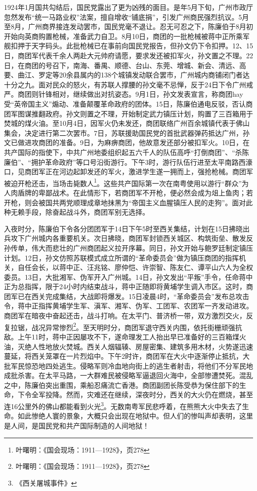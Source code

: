 1924年1月国共勾结后，国民党露出了更为凶残的面目。是年5月下旬，广州市政厅忽然发布“统一马路业权”法案，擅自增收“铺底捐”，引发广州商民强烈抗议。5月至8月，广州商界接连发动罢市，国民党毫不退让。忍无可忍之下，陈廉伯于8月初开始向英商购置枪械，准备武力自卫。8月10日，商团的一批枪械被蒋中正所乘军舰扣押于天字码头。此批枪械已在事前向国民党报告，但孙文仍下令扣押。12、15日，商团军代表千余人两赴大元帅府请愿，要求发还被扣军火，孙文置之不理。22日，在商团的号召下，南海、番禺、顺德、台山、东莞、增城、新会、清远、高要、曲江、罗定等20余县属内的138个城镇发动联合罢市，广州城内商铺闭门者达十分之九。面对民众的怒火，有苏联人撑腰的孙文毫不忌惮，反于24日下令广州戒严。商团则针锋相对，继续做出对抗姿态。9月1日，孙文发表宣言，称商团hay 受“英帝国主义”煽动、准备颠覆革命政府的团体。15日，陈廉伯通电反驳，否认商团军图谋推翻政府。孙文则置之不理，开始制定武力镇压计划，购置了三百箱用于焚城的煤火油。至10月4日，因军火仍未发还，商团联络广州百余城镇代表于佛山集会，决定进行第二次罢市。7日，苏联援助国民党的首批武器弹药抵达广州，孙文已做进攻商团的准备。9日，为麻痹商团，他故意发还部分被扣军火。10日，在共产国际的指使下，中共广州地委组织起五六千人的队伍高呼“打倒商团”、“杀陈廉伯”、“拥护革命政府”等口号沿街游行。下午3时，游行队伍行进至太平南路西濠口，见商团军正在河边起卸发还的军火，激进学生遂一拥而上，强抢枪械。商团军被迫开枪还击，当场击毙数人\footnote{叶曙明：《国会现场：1911—1928》，页278}。这些共产国际第一次在南粤使用以游行“群众”为人肉盾牌的卑鄙战术。在此情形下，若商团军不开枪，便必然会成为俎上鱼肉；若开枪，则会被国共两党顺理成章地抹黑为“帝国主义血腥镇压人民的走狗”。面对此种无赖手段，除奋起战斗外，商团军别无选择。

入夜时分，陈廉伯下令各分团团军于14日下午5时至西关集结，计划在15日拂晓出兵攻下广州城内各重要机关。次日拂晓，商团军封锁西关城区、构筑街垒、散发反孙传单，伟大而悲壮的广州商团起义拉开序幕。同日，孙文开始与鲍罗廷制定镇压计划。12日，孙文仿照苏联模式成立所谓的“革命委员会”做为镇压商团的指挥机关，自任会长，以蒋中正、汪兆铭、廖仲恺、许崇智、陈友仁、谭平山六人为全权委员。13日，大批湘军、伪军开入广州城。14日，孙文发出“平叛”手令，任命蒋中正为总指挥，限于24小时内结束战斗，蒋中正随即将黄埔学生调入市区。这时，商团军已在西关完成集结，大战即将爆发。15日凌晨4时，“革命委员会”发布总攻击令，蒋中正指挥黄埔学生军、滇军、湘军、伪军、工团军、农团军一齐发动进攻。商团军在暗夜中奋起还击，战斗打响。在太平门、普济桥一带，双方激烈交火，反复拉锯，战况异常惨烈\footnote{叶曙明：《国会现场：1911—1928》，页278}。至天明时分，商团军退守西关内围，依托街栅顽强抗敌。上午11时，蒋中正因屡攻不下，遂命理发工人抬出早已准备好的三百箱煤火油，灭绝人性地放火焚城。西关人烟辐辏、房屋密集、建筑多用木材，火势遂迅速蔓延，将西关笼罩在一片烈焰中。下午2时许，商团军在大火中逐渐停止抵抗，大批军民惊恐地四处逃生。侵略军则冷血地向街上的逃生者射击，将他们不分军民地成批杀害。在太平马路，一大群难民被侵略军逼退回火海中，全部惨遭焚死。混乱之中，陈廉伯突出重围，乘船忍痛流亡香港。商团副团长陈受恭为保住部下的生命，下令全军投降。然而，灾难还在继续，深夜时分，西关的大火仍在燃烧，甚至连16公里外的佛山都能看到火光\footnote{《西关屠城事件》}。无数南粤军民悲呼着，在熊熊大火中失去了生命。如此惨绝人寰的景象，大概只会出现在地狱中。但人们的惨叫声却表明，这里是人间，是国民党和共产国际制造的人间地狱！

